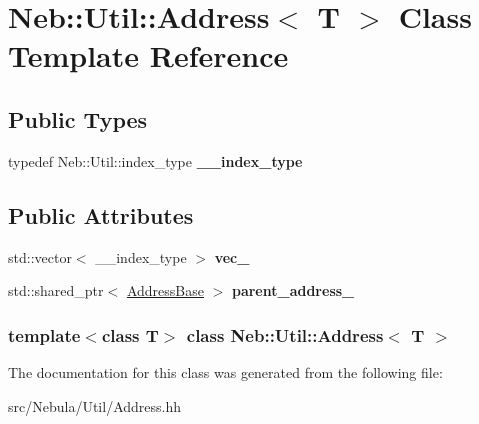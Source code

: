 \hypertarget{classNeb_1_1Util_1_1Address}{\section{\-Neb\-:\-:\-Util\-:\-:\-Address$<$ \-T $>$ \-Class \-Template \-Reference}
\label{classNeb_1_1Util_1_1Address}
}
\subsection*{\-Public \-Types}
\begin{DoxyCompactItemize}
\item 
\hypertarget{classNeb_1_1Util_1_1Address_a8473a52a118c7fc0d01fdecfeb48ee9a}{typedef \-Neb\-::\-Util\-::index\-\_\-type {\bfseries \-\_\-\-\_\-index\-\_\-type}}\label{classNeb_1_1Util_1_1Address_a8473a52a118c7fc0d01fdecfeb48ee9a}

\end{DoxyCompactItemize}
\subsection*{\-Public \-Attributes}
\begin{DoxyCompactItemize}
\item 
\hypertarget{classNeb_1_1Util_1_1Address_a8f008b567dc4fc80061f3ac7c0bbc6b2}{std\-::vector$<$ \-\_\-\-\_\-index\-\_\-type $>$ {\bfseries vec\-\_\-}}\label{classNeb_1_1Util_1_1Address_a8f008b567dc4fc80061f3ac7c0bbc6b2}

\item 
\hypertarget{classNeb_1_1Util_1_1Address_a8dbf69a3dad442cf82ec591ef637852d}{std\-::shared\-\_\-ptr$<$ \hyperlink{classNeb_1_1Util_1_1AddressBase}{\-Address\-Base} $>$ {\bfseries parent\-\_\-address\-\_\-}}\label{classNeb_1_1Util_1_1Address_a8dbf69a3dad442cf82ec591ef637852d}

\end{DoxyCompactItemize}
\subsubsection*{template$<$class T$>$ class Neb\-::\-Util\-::\-Address$<$ T $>$}



\-The documentation for this class was generated from the following file\-:\begin{DoxyCompactItemize}
\item 
src/\-Nebula/\-Util/\-Address.\-hh\end{DoxyCompactItemize}
